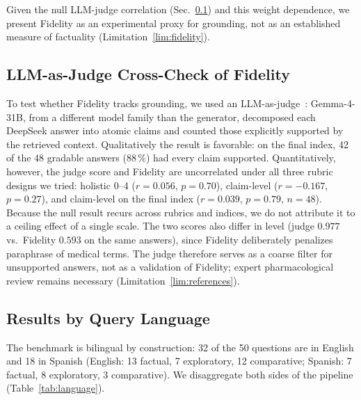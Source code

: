 \documentclass[runningheads]{llncs}
\begin{document}
Given the null LLM-judge correlation (Sec.~\ref{sec:llm_judge}) and this weight
dependence, we present Fidelity as an experimental proxy for grounding, not as an
established measure of factuality (Limitation~\ref{lim:fidelity}).

\subsection{LLM-as-Judge Cross-Check of Fidelity}
\label{sec:llm_judge}

To test whether Fidelity tracks grounding, we used an LLM-as-judge~\cite{zheng2023mtbench}: Gemma-4-31B, from a different model family than the generator, decomposed each DeepSeek answer into atomic claims and counted those explicitly supported by the retrieved context. Qualitatively the result is favorable: on the final index, 42 of the 48 gradable answers ($88\,\%$) had every claim supported. Quantitatively, however, the judge score and Fidelity are uncorrelated under all three rubric designs we tried: holistic 0--4 ($r{=}0.056$, $p{=}0.70$), claim-level ($r{=}{-}0.167$, $p{=}0.27$), and claim-level on the final index ($r{=}0.039$, $p{=}0.79$, $n{=}48$). Because the null result recurs across rubrics and indices, we do not attribute it to a ceiling effect of a single scale. The two scores also differ in level (judge $0.977$ vs.\ Fidelity $0.593$ on the same answers), since Fidelity deliberately penalizes paraphrase of medical terms. The judge therefore serves as a coarse filter for unsupported answers, not as a validation of Fidelity; expert pharmacological review remains necessary (Limitation~\ref{lim:references}).

\subsection{Results by Query Language}
\label{sec:language}

The benchmark is bilingual by construction: 32 of the 50 questions are in English and 18
in Spanish (English: 13 factual, 7 exploratory, 12 comparative; Spanish: 7 factual, 8
exploratory, 3 comparative). We disaggregate both sides of the pipeline (Table~\ref{tab:language}).
\end{document}
